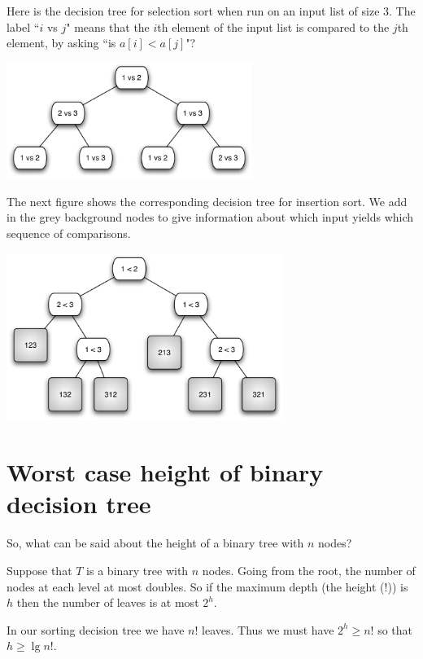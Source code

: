 \begin{Boxample}
Here is the decision tree for selection sort when run on an  input list of size $3$. The label 
``$i$ vs $j$" means that the $i$th element of the input list is compared to the $j$th element, by asking
``is $a[i] < a[j]$"?
\begin{center}
\includegraphics[width=8cm]{figs/selsort-dt}
\end{center}


The next figure shows the corresponding decision tree for insertion sort. We add in the grey background nodes to give information about 
which input yields which sequence of comparisons.
\begin{center}
\includegraphics[width=9cm]{figs/insort-dt}
\end{center} 
\end{Boxample}

\section{Worst case height of binary decision tree} 
So, what can be said about the height of a binary tree with 
$n$ nodes?

Suppose that $T$ is a binary tree with $n$ nodes. Going from the root, the
 number of nodes at each level at most doubles. So if the maximum depth (the 
 {height} (!)) is $h$ then the number of leaves is at most $2^h$. 
 
 In our sorting decision tree we have $n!$ leaves. Thus we must have $2^h 
\geq n!$ so that $h \geq \lg n!$. 

